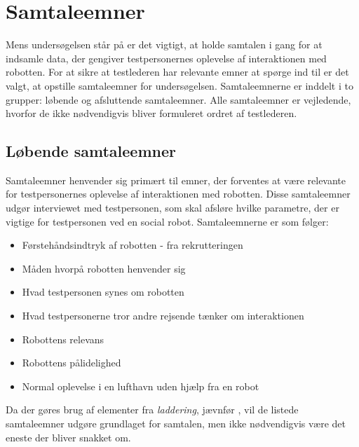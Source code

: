 \section{Samtaleemner}
\label{ParametreSamtaleemner}
%
Mens undersøgelsen står på er det vigtigt, at holde samtalen i gang for at indsamle data, der gengiver testpersonernes oplevelse af interaktionen med robotten. For at sikre at testlederen har relevante emner at spørge ind til er det valgt, at opstille samtaleemner for undersøgelsen. Samtaleemnerne er inddelt i to grupper: løbende og afsluttende samtaleemner. Alle samtaleemner er vejledende, hvorfor de ikke nødvendigvis bliver formuleret ordret af testlederen.

%
%
\subsection{Løbende samtaleemner} 
\label{ParametreSamtaleemner}
%
Samtaleemner henvender sig primært til emner, der forventes at være relevante for testpersonernes oplevelse af interaktionen med robotten. Disse samtaleemner udgør interviewet med testpersonen, som skal afsløre hvilke parametre, der er vigtige for testpersonen ved en social robot. Samtaleemnerne er som følger:\blankline
%
\begin{itemize}
\item Førstehåndsindtryk af robotten - fra rekrutteringen
\item Måden hvorpå robotten henvender sig
\item Hvad testpersonen synes om robotten
\item Hvad testpersonerne tror andre rejsende tænker om interaktionen 
\item Robottens relevans
\item Robottens pålidelighed
\item Normal oplevelse i en lufthavn uden hjælp fra en robot\blankline 
\end{itemize}
\noindent
%
Da der gøres brug af elementer fra \textit{laddering}, jævnfør , vil de listede samtaleemner udgøre grundlaget for samtalen, men ikke nødvendigvis være det eneste der bliver snakket om. 
%

